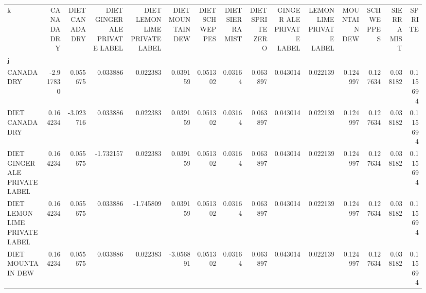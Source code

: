 \begin{tabular}{lrrrrrrrrrrrrrr}
\toprule
k &  CANADA DRY &  DIET CANADA DRY &  DIET GINGER ALE PRIVATE LABEL &  DIET LEMON LIME PRIVATE LABEL &  DIET MOUNTAIN DEW &  DIET SCHWEPPES &  DIET SIERRA MIST &  DIET SPRITE ZERO &  GINGER ALE PRIVATE LABEL &  LEMON LIME PRIVATE LABEL &  MOUNTAIN DEW &  SCHWEPPES &  SIERRA MIST &    SPRITE \\
j                             &             &                  &                                &                                &                    &                 &                   &                   &                           &                           &               &            &              &           \\
\midrule
CANADA DRY                    &   -2.917830 &         0.055675 &                       0.033886 &                       0.022383 &           0.039159 &        0.051302 &           0.03164 &          0.063897 &                  0.043014 &                  0.022139 &      0.124997 &   0.127634 &     0.038182 &  0.115694 \\
DIET CANADA DRY               &    0.164234 &        -3.023716 &                       0.033886 &                       0.022383 &           0.039159 &        0.051302 &           0.03164 &          0.063897 &                  0.043014 &                  0.022139 &      0.124997 &   0.127634 &     0.038182 &  0.115694 \\
DIET GINGER ALE PRIVATE LABEL &    0.164234 &         0.055675 &                      -1.732157 &                       0.022383 &           0.039159 &        0.051302 &           0.03164 &          0.063897 &                  0.043014 &                  0.022139 &      0.124997 &   0.127634 &     0.038182 &  0.115694 \\
DIET LEMON LIME PRIVATE LABEL &    0.164234 &         0.055675 &                       0.033886 &                      -1.745809 &           0.039159 &        0.051302 &           0.03164 &          0.063897 &                  0.043014 &                  0.022139 &      0.124997 &   0.127634 &     0.038182 &  0.115694 \\
DIET MOUNTAIN DEW             &    0.164234 &         0.055675 &                       0.033886 &                       0.022383 &          -3.056891 &        0.051302 &           0.03164 &          0.063897 &                  0.043014 &                  0.022139 &      0.124997 &   0.127634 &     0.038182 &  0.115694 \\

\end{tabular}
